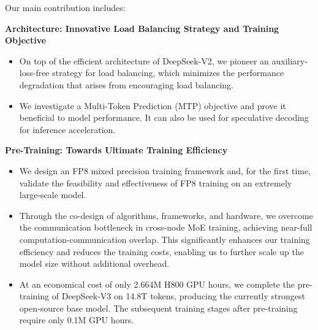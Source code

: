 \documentclass[11pt, a4paper, logo, copyright, nonumbering]{deepseek}
\newcommand{\dsvii}{DeepSeek-V2}
\newcommand{\dsviii}{DeepSeek-V3}
\begin{document}
\begin{CJK*}{UTF8}{gbsn}
Our main contribution includes:

\noindent
\textbf{Architecture: Innovative Load Balancing Strategy and Training Objective}
\begin{itemize}[topsep=0pt]
    \item 
    On top of the efficient architecture of \dsvii{}, we pioneer an auxiliary-loss-free strategy for load balancing, which minimizes the performance degradation that arises from encouraging load balancing.
    \item 
    We investigate a Multi-Token Prediction (MTP) objective and prove it beneficial to model performance. 
    It can also be used for speculative decoding for inference acceleration. 
\end{itemize}

\noindent
\textbf{Pre-Training: Towards Ultimate Training Efficiency}
\begin{itemize}[topsep=0pt]
    \item
    We design an FP8 mixed precision training framework and, for the first time, validate the feasibility and effectiveness of FP8 training on an extremely large-scale model. 
    \item 
    Through the co-design of algorithms, frameworks, and hardware, we overcome the communication bottleneck in cross-node MoE training, achieving near-full computation-communication overlap. 
    This significantly enhances our training efficiency and reduces the training costs, enabling us to further scale up the model size without additional overhead.
    \item 
    At an economical cost of only 2.664M H800 GPU hours, we complete the pre-training of \dsviii{} on 14.8T tokens, producing the currently strongest open-source base model. 
    The subsequent training stages after pre-training require only 0.1M GPU hours.
\end{itemize}


\end{CJK*}
\end{document}
